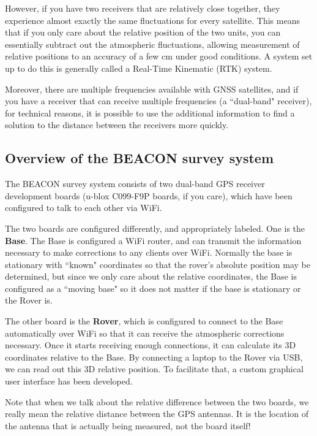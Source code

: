 \documentclass[usletter]{article}
\begin{document}
However, if you have two receivers that are relatively close together, they
experience almost exactly the same fluctuations for every satellite. This means
that if you only care about the relative position of the two units, you can
essentially subtract out the atmospheric fluctuations, allowing
measurement of relative positions to an accuracy of a few cm under good
conditions. A system set up to do this is generally called a Real-Time Kinematic
(RTK) system. 

Moreover, there are multiple frequencies available with GNSS satellites, and
if you have a receiver that can receive multiple frequencies (a ``dual-band"
receiver), for technical reasons, it is possible to use the additional
information to find a solution to the distance between the receivers more
quickly.

\subsection{ Overview of the BEACON survey system} 

The BEACON survey system consists of two dual-band GPS receiver development
boards (u-blox C099-F9P boards, if you care), which have been  configured to talk to each other via WiFi.

The two boards are configured differently, and appropriately labeled. One is
the \textbf{Base}.  The Base is configured a WiFi router, and can transmit the information
necessary to make corrections to any clients over WiFi. Normally the base is stationary with ``known" coordinates so that the rover's absolute position may be determined, but since we only care about the relative coordinates, the Base is configured as a ``moving base"  so it does not matter if the base is stationary or the Rover is. 

The other board is the \textbf{Rover}, which is configured to connect to the
Base automatically over WiFi so that it can receive the atmospheric corrections
necessary. Once it starts receiving enough connections, it can calculate its 3D
coordinates relative to the Base. By connecting a laptop to the Rover via USB,
we can read out this 3D relative position. To facilitate that, a custom
graphical user interface has been developed. 

Note that when we talk about the relative difference between the two boards, we
really mean the relative distance between the GPS antennas. It is the location
of the antenna that is actually being measured, not the board itself! 
\end{document}
